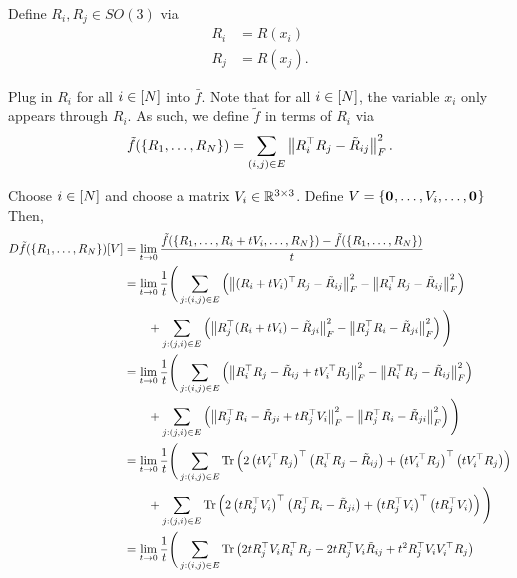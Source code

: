Define $R_i, R_j \in SO(3)$ via
\begin{align}
    R_i &= R(x_i)
    \\
    R_j &= R(x_j).
\end{align}

Plug in $R_i$ for all $i\in[N]$ into $\bar{f}$.
Note that for all $i\in[N]$, the variable $x_i$ only appears through $R_i$.
As such, we define $\tilde{f}$ in terms of $R_i$ via
\begin{equation}
    \tilde{f}(\{R_1,\dots,R_N\}) = \sum_{(i,j)\in E} \left\lVert R_i^\top R_j - \tilde{R}_{ij} \right\rVert_F^2.
\end{equation}

Choose $i\in[N]$ and choose a matrix $V_i \in \mathbb{R}^{3\times 3}$.
Define $V = \{\mathbf{0}^{},\dots,V_i,\dots,\mathbf{0}^{}\}$
Then,
\begin{align}
    D \tilde{f}(\{R_1,\dots,R_N\})[V]
    &= \lim_{t\to0} \frac{\tilde{f}(\{R_1,\dots,R_i+tV_i,\dots,R_N\}) - \tilde{f}(\{R_1,\dots,R_N\})}{t}
    \\
    &= \lim_{t\to0} \frac{1}{t} \Bigg( \sum_{j:(i,j)\in E} \left( \norm{(R_i+tV_i)^\top R_j - \tilde{R}_{ij}}_F^2 - \norm{R_i^\top R_j - \tilde{R}_{ij}}_F^2 \right) \\ 
    &\qquad + \sum_{j:(j,i)\in E} \left( \norm{R_j^\top (R_i+tV_i) - \tilde{R}_{ji}}_F^2 - \norm{R_j^\top R_i - \tilde{R}_{ji}}_F^2\right) \Bigg)
    \\
    &= \lim_{t\to0} \frac{1}{t} \Bigg( \sum_{j:(i,j)\in E} \left( \norm{R_i^\top R_j - \tilde{R}_{ij} + tV_i^\top R_j}_F^2 - \norm{R_i^\top R_j - \tilde{R}_{ij}}_F^2 \right) \\ 
    &\qquad + \sum_{j:(j,i)\in E} \left( \norm{R_j^\top R_i - \tilde{R}_{ji} + t R_j^\top V_i}_F^2 - \norm{R_j^\top R_i - \tilde{R}_{ji}}_F^2\right) \Bigg)
    \\
    &= \lim_{t\to0} \frac{1}{t} \Bigg( \sum_{j:(i,j)\in E} \trace \left( 2 \left(tV_i^\top R_j\right)^\top \left(R_i^\top R_j - \tilde{R}_{ij}\right) + \left(tV_i^\top R_j\right)^\top \left(tV_i^\top R_j\right) \right) \\ 
    &\qquad + \sum_{j:(j,i)\in E} \trace \left( 2 \left(t R_j^\top V_i\right)^\top \left(R_j^\top R_i - \tilde{R}_{ji}\right) + \left(t R_j^\top V_i\right)^\top \left(t R_j^\top V_i\right) \right) \Bigg)
    \\
    &= \lim_{t\to0} \frac{1}{t} \Bigg( \sum_{j:(i,j)\in E} \trace \left( 2 t R_j^\top V_i R_i^\top R_j - 2 t R_j^\top V_i \tilde{R}_{ij} + t^2 R_j^\top V_i V_i^\top R_j \right) \\ 

\end{align}
